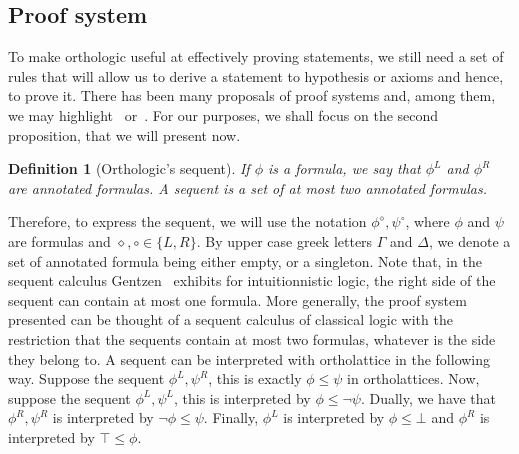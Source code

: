 \documentclass[a4paper, 11pt]{article}
\newtheorem{definition}[theorem]{Definition}
\begin{document}
    \subsection{Proof system}
    To make orthologic useful at effectively proving statements, we still need a set of rules that will
    allow us to derive a statement to hypothesis or axioms and hence, to prove it. There has been 
    many proposals of proof systems and, among them, we may highlight~\cite{Laurent17a} 
    or~\cite{10.1145/3632881}. For our purposes, we shall focus on the second proposition, that we will
    present now.
    \begin{definition}[Orthologic's sequent]
	    If $\phi$ is a formula, we say that $\phi^L$ and $\phi^R$ are annotated formulas. A 
	    sequent is a set of at most two annotated formulas.
    \end{definition}
    Therefore, to express the sequent, we will use the notation $\phi^\diamond,\psi^\circ$, where 
    $\phi$ and $\psi$ are formulas and $\diamond,\circ\in\{L,R\}$. By upper case greek letters $\Gamma$ 
    and $\Delta$, we denote a set of annotated formula being either empty, or a singleton. Note that,
    in the sequent calculus
    Gentzen~\cite{Gentzen1935UntersuchungenD} exhibits for intuitionnistic logic, the right side of the 
    sequent can contain at most one formula. More generally, the proof system presented can be thought
    of a sequent calculus of classical logic with the restriction that the sequents contain at most
    two formulas, whatever is the side they belong to.
    A sequent can be interpreted with ortholattice in the following way. Suppose the sequent 
    $\phi^L,\psi^R$, this is exactly $\phi\leq\psi$ in ortholattices. Now, suppose the sequent 
    $\phi^L,\psi^L$, this is interpreted by $\phi\leq\neg\psi$. Dually, we have that $\phi^R,\psi^R$
    is interpreted by $\neg\phi\leq\psi$. Finally, $\phi^L$ is interpreted by $\phi\leq\bot$ and
    $\phi^R$ is interpreted by $\top\leq\phi$.
\end{document}
